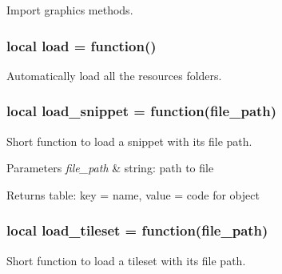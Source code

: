 Import graphics methods. 

\hypertarget{resource_8lua_aea1dc50e03db80d1e2c31e4e1e8de983}{
\subsubsection[{load}]{\setlength{\rightskip}{0pt plus 5cm}local load = function()}}\label{resource_8lua_aea1dc50e03db80d1e2c31e4e1e8de983}


Automatically load all the resources folders. 

\hypertarget{resource_8lua_a78c7047e9396ef2b6b50b42f3f25bcda}{
\subsubsection[{load\-\_\-snippet}]{\setlength{\rightskip}{0pt plus 5cm}local load\-\_\-snippet = function(file\-\_\-path)}}\label{resource_8lua_a78c7047e9396ef2b6b50b42f3f25bcda}


Short function to load a snippet with its file path. 


\begin{DoxyParams}{Parameters}
{\em file\-\_\-path} & string\-: path to file \\
\hline
\end{DoxyParams}
\begin{DoxyReturn}{Returns}
table\-: key = name, value = code for object 
\end{DoxyReturn}
\hypertarget{resource_8lua_ad3d57591837e830db7d942539a655cd9}{
\subsubsection[{load\-\_\-tileset}]{\setlength{\rightskip}{0pt plus 5cm}local load\-\_\-tileset = function(file\-\_\-path)}}\label{resource_8lua_ad3d57591837e830db7d942539a655cd9}


Short function to load a tileset with its file path. 


